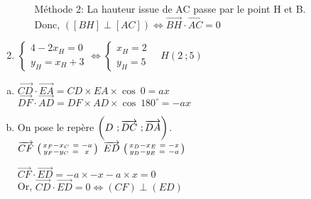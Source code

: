 \documentclass[12pt, a4paper]{article}
\begin{document}
\begin{Exercise}[number={79}]
\begin{enumerate}[1)]
\begin{itemize}[leftmargin=3cm]
                        \item[Méthode 2:] La hauteur issue de AC passe par le point H et B. \\ Donc, \quad $([BH]\perp[AC])\iff\overrightarrow{BH}\cdot\overrightarrow{AC}=0$
                    \end{itemize}
        \item $\begin{cases}4-2x_H=0\\[0.2cm]y_H=x_H+3\end{cases}\iff\begin{cases}x_H=2\\[0.2cm]y_H=5\end{cases} \quad H(2\ ;5)$
    \end{enumerate}
\end{Exercise}

\begin{Exercise}[number={81}]
    \begin{enumerate}[a)]
        \item $\overrightarrow{CD}\cdot\overrightarrow{EA}=CD\times EA\times\cos{\ 0}=ax$ \\ $\overrightarrow{DF}\cdot\overrightarrow{AD}=DF\times AD\times\cos{\ 180^{\circ}}=-ax$
        \item On pose le repère $\delimiterfactor=1200\left(D\ ;\overrightarrow{DC}\ ;\overrightarrow{DA}\right)$.\medskip \\ 
                    $\overrightarrow{CF}\ \begin{psmallmatrix}x_F-x_C\ =& -a\\y_F-y_C\ =& x\end{psmallmatrix}$ \smallbreak $\overrightarrow{ED}\ \begin{psmallmatrix}x_D-x_E\ =& -x\\y_D-y_E\ =& -a\end{psmallmatrix}$ \medbreak
                    
                    $\overrightarrow{CF}\cdot\overrightarrow{ED}=-a\times-x-a\times x=0$ \smallskip \\
                    Or, \quad $\overrightarrow{CD}\cdot\overrightarrow{ED}=0\iff(CF)\perp(ED)$
    \end{enumerate}
\end{Exercise}
\end{document}
